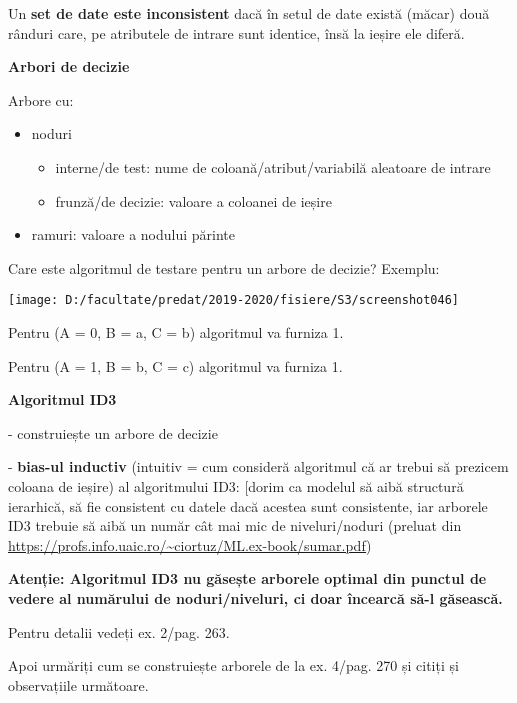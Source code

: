 \documentclass[12pt]{article}
\begin{document}
	Un \textbf{set de date este inconsistent} dacă în setul de date există (măcar) două rânduri care, pe atributele de intrare sunt identice, însă la ieșire ele diferă.
	
	\textbf{\large{Arbori de decizie}}
	
	Arbore cu:
	\begin{itemize}
		\item noduri
		\begin{itemize}
			\item interne/de test: nume de coloană/atribut/variabilă aleatoare de intrare
			\item frunză/de decizie: valoare a coloanei de ieșire
		\end{itemize}
		\item ramuri: valoare a nodului părinte
	\end{itemize}
	Care este algoritmul de testare pentru un arbore de decizie?
	Exemplu:
	
	\begin{center}
		\texttt{[image: D:/facultate/predat/2019-2020/fisiere/S3/screenshot046]}
	\end{center}
	
	
	Pentru (A = 0, B = a, C = b) algoritmul va furniza 1.
	
	Pentru (A = 1, B = b, C = c) algoritmul va furniza 1.
	
	\textbf{\large{Algoritmul ID3}}
	
	- construiește un arbore de decizie
	
	- \textbf{bias-ul inductiv} (intuitiv = cum consideră algoritmul că ar trebui să prezicem coloana de ieșire) al algoritmului ID3: [dorim ca modelul să aibă structură ierarhică, să fie consistent cu datele dacă acestea sunt consistente, iar arborele ID3 trebuie să aibă un număr cât mai mic de niveluri/noduri
	(preluat din \url{https://profs.info.uaic.ro/~ciortuz/ML.ex-book/sumar.pdf})
	
	\textbf{Atenție: Algoritmul ID3 nu găsește arborele optimal din punctul de vedere al numărului de noduri/niveluri, ci doar încearcă să-l găsească.}
	
	Pentru detalii vedeți ex. 2/pag. 263.
	
	Apoi urmăriți cum se construiește arborele de la ex. 4/pag. 270 și citiți și observațiile următoare.
	
\end{document}
